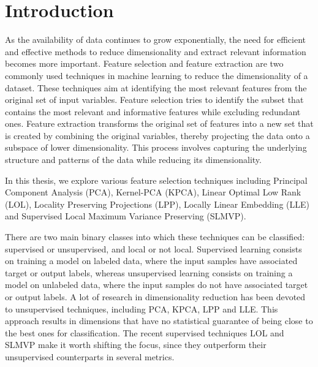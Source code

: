 \chapter{Introduction}

%

As the availability of data continues to grow exponentially, the need for efficient and effective methods to reduce dimensionality and extract relevant information becomes more important.
Feature selection and feature extraction are two commonly used techniques in machine learning to reduce the dimensionality of a dataset. These techniques aim at identifying the most relevant features from the original set of input variables.
Feature selection tries to identify the subset that contains the most relevant and informative features while excluding redundant ones.
Feature extraction transforms the original set of features into a new set that is created by combining the original variables, thereby projecting the data onto a subspace of lower dimensionality. This process involves capturing the underlying structure and patterns of the data while reducing its dimensionality.

In this thesis, we explore various feature selection techniques including Principal Component Analysis (PCA), Kernel-PCA (KPCA), Linear Optimal Low Rank (LOL), Locality Preserving Projections (LPP), Locally Linear Embedding (LLE) and Supervised Local Maximum Variance Preserving (SLMVP).

There are two main binary classes into which these techniques can be classified: supervised or unsupervised, and local or not local.
Supervised learning consists on training a model on labeled data, where the input samples have associated target or output labels, whereas unsupervised learning consists on training a model on unlabeled data, where the input samples do not have associated target or output labels. A lot of research in dimensionality reduction has been devoted to unsupervised techniques, including PCA, KPCA, LPP and LLE. This approach results in dimensions that have no statistical guarantee of being close to the best ones for classification. The recent supervised techniques LOL and SLMVP make it worth shifting the focus, since they outperform their unsupervised counterparts in several metrics.

